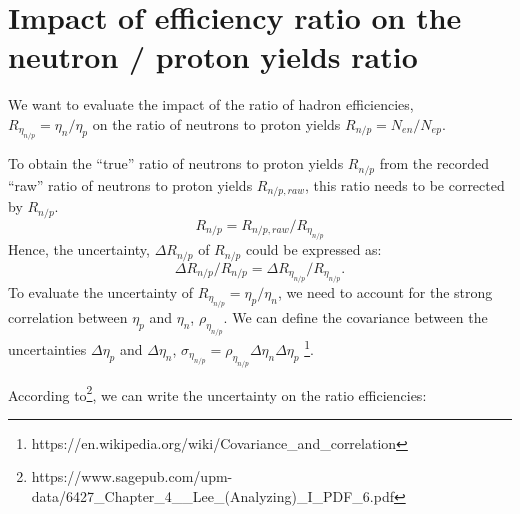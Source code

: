 \documentclass[11pt]{article}
\begin{document}
\section*{Impact of efficiency ratio on the neutron / proton yields ratio}

{\hskip 0.7cm}We want to evaluate the impact of the ratio of hadron efficiencies,\\
$R_{\eta_{n/p}} = \eta_n/\eta_p$
on the ratio of neutrons to proton yields $R_{n/p} = N_{en}/N_{ep}$.

To obtain the ``true'' ratio of neutrons to proton yields $R_{n/p}$ from the recorded ``raw''
ratio of neutrons to proton yields $R_{n/p, raw}$,
this ratio needs to be corrected by $R_{n/p}$.
%
\begin{equation}
  R_{n/p} = R_{n/p, raw}/R_{\eta_{n/p}}
\end{equation}
%
Hence, the uncertainty, $\Delta R_{n/p}$ of $R_{n/p}$ could be expressed as:
%
\begin{equation}
  \Delta R_{n/p}/R_{n/p} = \Delta R_{\eta_{n/p}}/R_{\eta_{n/p}}.
\end{equation}
%
To evaluate the uncertainty of $R_{\eta_{n/p}} = \eta_p/\eta_n$,
we need to account for the strong correlation between $\eta_p$ and $\eta_n$, $\rho_{\eta_{n/p}}$. 
We can define the covariance between the uncertainties $\Delta \eta_p$ and $\Delta \eta_n$,
$\sigma_{\eta_{n/p}} = \rho_{\eta_{n/p}} \Delta \eta_{n} \Delta \eta_{p}$ \footnote{https://en.wikipedia.org/wiki/Covariance\_and\_correlation}.

According to\footnote{https://www.sagepub.com/upm-data/6427\_Chapter\_4\_\_Lee\_(Analyzing)\_I\_PDF\_6.pdf}, we can write the uncertainty on the ratio efficiencies:
\end{document}
